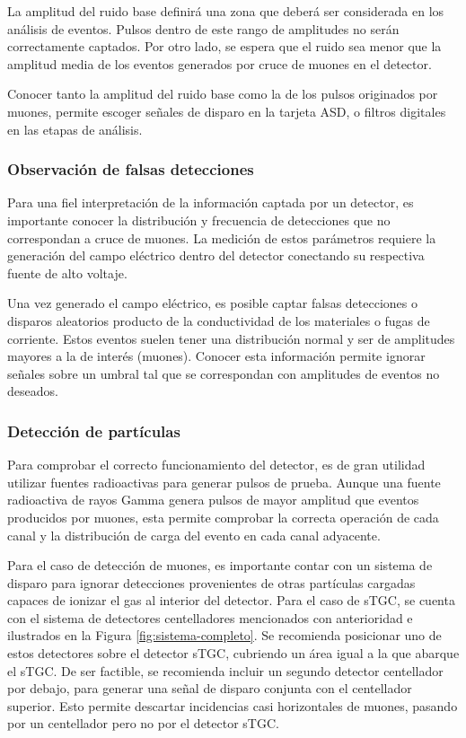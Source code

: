 		La amplitud del ruido base definirá una zona que deberá ser considerada en los análisis de eventos. Pulsos dentro de este rango de amplitudes no serán correctamente captados. Por otro lado, se espera que el ruido sea menor que la amplitud media de los eventos generados por cruce de muones en el detector.
		
		Conocer tanto la amplitud del ruido base como la de los pulsos originados por muones, permite escoger señales de disparo en la tarjeta ASD, o filtros digitales en las etapas de análisis. 
		
	\subsubsection{Observación de falsas detecciones}
		Para una fiel interpretación de la información captada por un detector, es importante conocer la distribución y frecuencia de detecciones que no correspondan a cruce de muones. La medición de estos parámetros requiere la generación del campo eléctrico dentro del detector conectando su respectiva fuente de alto voltaje.
		
		Una vez generado el campo eléctrico, es posible captar falsas detecciones o disparos aleatorios producto de la conductividad de los materiales o fugas de corriente. Estos eventos suelen tener una distribución normal y ser de amplitudes mayores a la de interés (muones). Conocer esta información permite ignorar señales sobre un umbral tal que se correspondan con amplitudes de eventos no deseados.
	
	\subsubsection{Detección de partículas}
		Para comprobar el correcto funcionamiento del detector, es de gran utilidad utilizar fuentes radioactivas para generar pulsos de prueba. Aunque una fuente radioactiva de rayos Gamma genera pulsos de mayor amplitud que eventos producidos por muones, esta permite comprobar la correcta operación de cada canal y la distribución de carga del evento en cada canal adyacente.
	
		Para el caso de detección de muones, es importante contar con un sistema de disparo para ignorar detecciones provenientes de otras partículas cargadas capaces de ionizar el gas al interior del detector. Para el caso de sTGC, se cuenta con el sistema de detectores centelladores mencionados con anterioridad e ilustrados en la Figura \ref{fig:sistema-completo}. Se recomienda posicionar uno de estos detectores sobre el detector sTGC, cubriendo un área igual a la que abarque el sTGC. De ser factible, se recomienda incluir un segundo detector centellador por debajo, para generar una señal de disparo conjunta con el centellador superior. Esto permite descartar incidencias casi horizontales de muones, pasando por un centellador pero no por el detector sTGC.
		